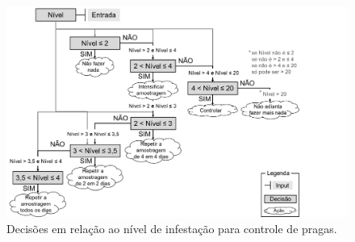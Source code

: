 \documentclass[
  11pt,
  a5paper,
  openany]{book}
\begin{document}
\begin{figure}

{\centering \includegraphics[width=1\linewidth]{images/Fig_Cond8} 

}

\caption{Decisões em relação ao nível de infestação para controle de pragas.}\label{fig:FigCond8}
\end{figure}
\end{document}
